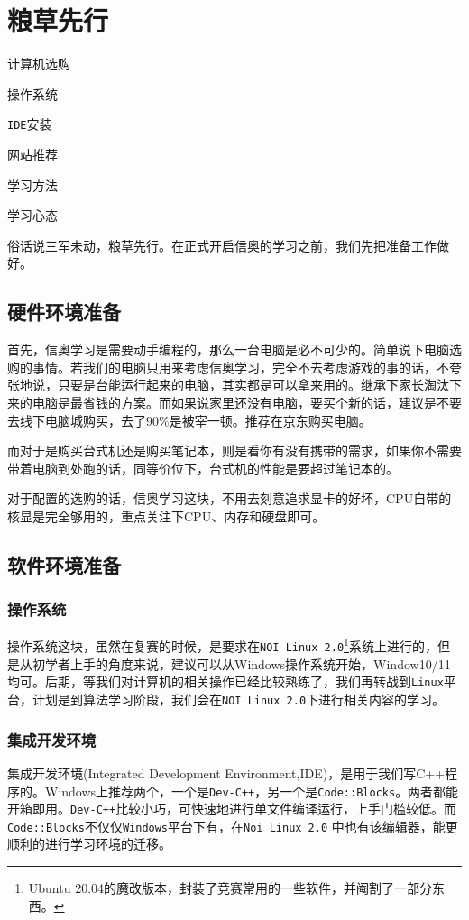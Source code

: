 \chapter{粮草先行}
\begin{introduction}
	\item 计算机选购
	\item 操作系统
	\item \texttt{IDE}安装
	\item 网站推荐
	\item 学习方法
	\item 学习心态
\end{introduction}

俗话说三军未动，粮草先行。在正式开启信奥的学习之前，我们先把准备工作做好。
\section{硬件环境准备}
首先，信奥学习是需要动手编程的，那么一台电脑是必不可少的。简单说下电脑选购的事情。若我们的电脑只用来考虑信奥学习，完全不去考虑游戏的事的话，不夸张地说，只要是台能运行起来的电脑，其实都是可以拿来用的。继承下家长淘汰下来的电脑是最省钱的方案。而如果说家里还没有电脑，要买个新的话，建议是不要去线下电脑城购买，去了$ 90\% $是被宰一顿。推荐在京东购买电脑。

而对于是购买台式机还是购买笔记本，则是看你有没有携带的需求，如果你不需要带着电脑到处跑的话，同等价位下，台式机的性能是要超过笔记本的。

对于配置的选购的话，信奥学习这块，不用去刻意追求显卡的好坏，CPU自带的核显是完全够用的，重点关注下CPU、内存和硬盘即可。
\section{软件环境准备}
\subsection{操作系统}
操作系统这块，虽然在复赛的时候，是要求在\texttt{NOI Linux 2.0}\footnote{Ubuntu 20.04的魔改版本，封装了竞赛常用的一些软件，并阉割了一部分东西。}系统上进行的，但是从初学者上手的角度来说，建议可以从Windows操作系统开始，Window10/11均可。后期，等我们对计算机的相关操作已经比较熟练了，我们再转战到\texttt{Linux}平台，计划是到算法学习阶段，我们会在\texttt{NOI Linux 2.0}下进行相关内容的学习。
\subsection{集成开发环境}
集成开发环境(Integrated Development Environment,IDE)，是用于我们写C++程序的。Windows上推荐两个，一个是\texttt{Dev-C++}，另一个是\texttt{Code::Blocks}。两者都能开箱即用。\texttt{Dev-C++}比较小巧，可快速地进行单文件编译运行，上手门槛较低。而\texttt{Code::Blocks}不仅仅\texttt{Windows}平台下有，在\texttt{Noi Linux 2.0} 中也有该编辑器，能更顺利的进行学习环境的迁移。

